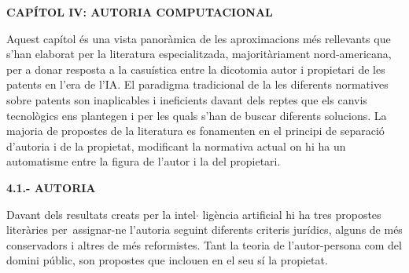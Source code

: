 \documentclass[12pt]{article}
\begin{document}
\vspace{\baselineskip}

\vspace{\baselineskip}
\begin{Center}
{\fontsize{16pt}{19.2pt}\selectfont \textbf{CAPÍTOL IV: AUTORIA COMPUTACIONAL}\par}
\end{Center}\par


\vspace{\baselineskip}
\begin{justify}
Aquest capítol és una vista panoràmica de les aproximacions més rellevants que s’han elaborat per la literatura especialitzada, majoritàriament nord-americana, per a donar resposta a la casuística entre la dicotomia autor i propietari de les patents en l’era de l’IA. El paradigma tradicional de la les diferents normatives sobre patents son inaplicables i ineficients davant dels reptes que els canvis tecnològics ens plantegen i per les quals s’han de buscar diferents solucions. La majoria de propostes de la literatura es fonamenten en el principi de separació d’autoria i de la propietat, modificant la normativa actual on hi ha un automatisme entre la figura de l’autor i la del propietari. 
\end{justify}\par


\vspace{\baselineskip}
\begin{justify}
\textbf{4.1.- AUTORIA}
\end{justify}\par


\vspace{\baselineskip}

\vspace{\baselineskip}
\begin{justify}
Davant dels resultats creats per la intel$ \cdot $ ligència artificial hi ha tres propostes literàries per\ assignar-ne l’autoria seguint diferents criteris jurídics, alguns de més  conservadors i altres de més reformistes. Tant la teoria de l’autor-persona com del domini públic, son propostes que inclouen en el seu sí la propietat. 
\end{justify}\par


\vspace{\baselineskip}

\vspace{\baselineskip}
\end{document}
